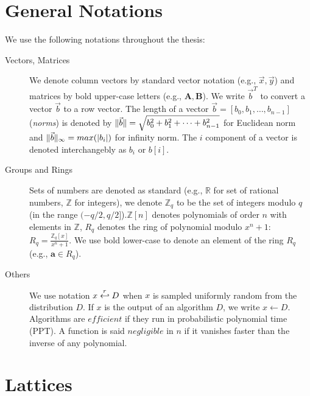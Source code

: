 \section{General Notations}
\label{sec:defGeneral}
We use the following notations throughout the thesis:
\begin{description}
\item[Vectors, Matrices] We denote column vectors by standard vector notation
  (e.g., \(\vec{x}, \vec{y}\)) and matrices by bold upper-case letters (e.g.,
  \(\mathbf{A}, \mathbf{B}\)). We write \(\vec{b}^{T}\) to convert a vector
  \(\vec{b}\) to a row vector. The length of a vector
  \(\vec{b} = [b_{0}, b_{1}, \dots, b_{n-1}]\) (\textit{norms}) is denoted by
  \(\Vert \vec{b} \Vert = \sqrt{b_{0}^{2} + b_{1}^{2} + \dots + b_{n-1}^{2}}\) for
  Euclidean norm and \(\Vert \vec{b} \Vert_{\infty} = max(|b_{i}|)\) for infinity norm. The
  \(i\) component of a vector is denoted interchangebly as \(b_{i}\) or
  \(b[i]\).
\item[Groups and Rings] Sets of numbers are denoted as standard (e.g.,
  \(\mathbb{R}\) for set of rational numbers, \(\mathbb{Z}\) for integers), we
  denote \(\mathbb{Z}_{q}\) to be the set of integers modulo \(q\) (in the range
  \((-q/2,q/2]\)).\(\mathbb{Z}[n]\) denotes polynomials of order \(n\) with
  elements in \(\mathbb{Z}\), \(R_{q}\) denotes the ring of polynomial modulo
  \(x^{n} + 1\): \(R_{q} = \frac{\mathbb{Z}_{q}[x]}{x^{n} + 1}\). We use bold
  lower-case to denote an element of the ring \(R_{q}\) (e.g.,
  \(\mathbf{a} \in R_q\)).
\item[Others] We use notation \(x \stackrel{r}{\hookleftarrow} D\) when \(x\) is sampled
  uniformly random from the distribution \(D\). If \(x\) is the output of an
  algorithm \(D\), we write \(x \gets D\). Algorithms are \(efficient\) if they
  run in probabilistic polynomial time (PPT). A function is said \(negligible\)
  in \(n\) if it vanishes faster than the inverse of any polynomial.
\end{description}

\section{Lattices}
\label{sec:defLattices}

